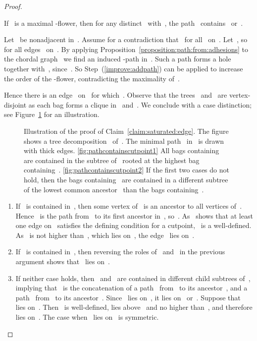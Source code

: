 \begin{proof}
\begin{claim} \label{claim:saturated:edge}
If~ is a maximal -flower, then for any distinct~ with~, the path~ contains~ or~.
\end{claim}
\begin{claimproof}
Let~ be nonadjacent in~. Assume for a contradiction that~ for all~ on~. Let~, so~ for all edges~ on~. By applying Proposition~\ref{proposition:path:from:adhesions} to the chordal graph~ we find an induced -path in~. Such a path forms a hole together with~, since~. So Step~(\ref{improve:addpath}) can be applied to increase the order of the -flower,  contradicting the maximality of~.

Hence there is an edge~ on~ for which~. Observe that the trees~ and~ are vertex-disjoint as each bag forms a clique in~ and~. We conclude with a case distinction; see Figure~\ref{fig:pathcontainscutpoint} for an illustration.

\begin{figure}[t]
\begin{center}
\caption{Illustration of the proof of Claim~\ref{claim:saturated:edge}. The figure shows a tree decomposition~ of~. The minimal path~ in~ is drawn with thick edges. \ref{fig:pathcontainscutpoint1} All bags containing~ are contained in the subtree of~ rooted at the highest bag containing~. \ref{fig:pathcontainscutpoint2} If the first two cases do not hold, then the bags containing~ are contained in a different subtree of the lowest common ancestor~ than the bags containing~.} \label{fig:pathcontainscutpoint}
\end{center}
\end{figure}

\begin{enumerate}
	\item \label{case:containcutpointsbelowt} If~ is contained in~, then some vertex of~ is an ancestor to all vertices of~. Hence~ is the path from~ to its first ancestor in~, so~. As~ shows that at least one edge on~ satisfies the defining condition for a cutpoint,~ is a well-defined. As~ is not higher than~, which lies on~, the edge~ lies on~.
	\item If~ is contained in~, then reversing the roles of~ and~ in the previous argument shows that~ lies on~.
	\item \label{case:containcutpointlca} If neither case holds, then~ and~ are contained in different child subtrees of~, implying that~ is the concatenation of a path~ from~ to its ancestor~, and a path~ from~ to its ancestor~. Since~ lies on~, it lies on~ or~. Suppose that~ lies on~. Then~ is well-defined, lies above~ and no higher than~, and therefore lies on~. The case when~ lies on~ is symmetric.\qedhere
\end{enumerate}
\end{claimproof}


\end{proof}
